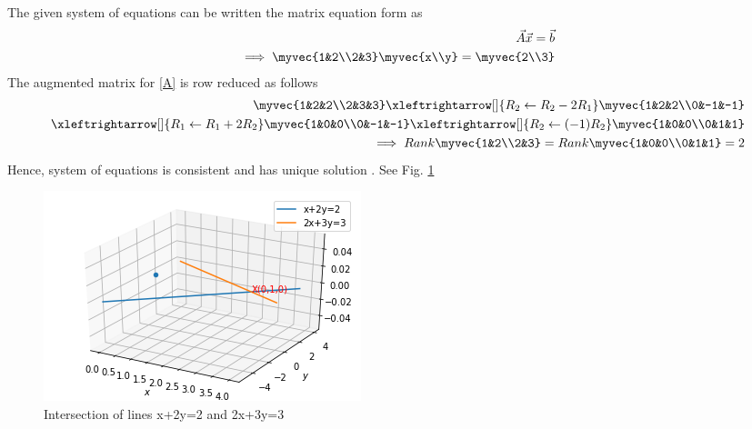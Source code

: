 The given system of equations can be written the matrix equation form as
\begin{align}
    \vec{A}\vec{x}=\vec{b}\\
    \label{:solutions/det/52/A}
    \implies \myvec{1&2\\2&3}\myvec{x\\y}=\myvec{2\\3}
\end{align}
The augmented matrix for \eqref{A} is row reduced as follows
\begin{align}
    \myvec{1&2&2\\2&3&3}
    \xleftrightarrow[]{R_2\leftarrow R_2-2R_1}
    \myvec{1&2&2\\0&-1&-1}\\
   \xleftrightarrow[]{R_1\leftarrow R_1+2R_2}
    \myvec{1&0&0\\0&-1&-1}
    \xleftrightarrow[]{R_2\leftarrow (-1)R_2}
    \myvec{1&0&0\\0&1&1}\\
    \implies Rank\myvec{1&2\\2&3}=Rank\myvec{1&0&0\\0&1&1} =2
\end{align}
Hence, system of equations is consistent and has unique solution . See Fig. \ref{fig1:solutions/det/52/}

\begin{figure}[!ht]
\centering
\includegraphics[width=\columnwidth]{./solutions/det/52/A2.png}
\caption{Intersection of lines x+2y=2 and 2x+3y=3}
\label{fig1:solutions/det/52/}
\end{figure}
